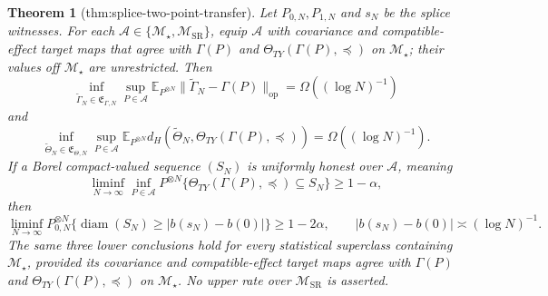 \documentclass{article}
\newtheorem{theorem}{Theorem}
\begin{document}
\begin{theorem}[thm:splice-two-point-transfer]\label{thm:splice-two-point-transfer}
Let \(P_{0,N},P_{1,N}\) and \(s_N\) be the splice witnesses.  For each \(\mathcal A\in\{\mathcal M_\star,\mathcal M_{\mathrm{SR}}\}\), equip \(\mathcal A\) with covariance and compatible-effect target maps that agree with \(\Gamma(P)\) and \(\Theta_{TY}(\Gamma(P),\preceq)\) on \(\mathcal M_\star\); their values off \(\mathcal M_\star\) are unrestricted.  Then
\[
 \inf_{\widetilde\Gamma_N\in\mathfrak E_{\Gamma,N}}
 \sup_{P\in\mathcal A}
 \mathbb E_{P^{\otimes N}}\|\widetilde\Gamma_N-\Gamma(P)\|_{\mathrm{op}}
 =\Omega((\log N)^{-1})
\]
and
\[
 \inf_{\widetilde\Theta_N\in\mathfrak E_{\Theta,N}}
 \sup_{P\in\mathcal A}
 \mathbb E_{P^{\otimes N}}
 d_H\!\left(\widetilde\Theta_N,\Theta_{TY}(\Gamma(P),\preceq)\right)
 =\Omega((\log N)^{-1}).
\]
If a Borel compact-valued sequence \((S_N)\) is uniformly honest over \(\mathcal A\), meaning
\[
 \liminf_{N\to\infty}\inf_{P\in\mathcal A}P^{\otimes N}
 \{\Theta_{TY}(\Gamma(P),\preceq)\subseteq S_N\}\ge1-\alpha,
\]
then
\[
 \liminf_{N\to\infty}P_{0,N}^{\otimes N}
 \{\operatorname{diam}(S_N)\ge |b(s_N)-b(0)|\}\ge1-2\alpha,
 \qquad |b(s_N)-b(0)|\asymp(\log N)^{-1}.
\]
The same three lower conclusions hold for every statistical superclass containing \(\mathcal M_\star\), provided its covariance and compatible-effect target maps agree with \(\Gamma(P)\) and \(\Theta_{TY}(\Gamma(P),\preceq)\) on \(\mathcal M_\star\).  No upper rate over \(\mathcal M_{\mathrm{SR}}\) is asserted.
\end{theorem}
\end{document}
